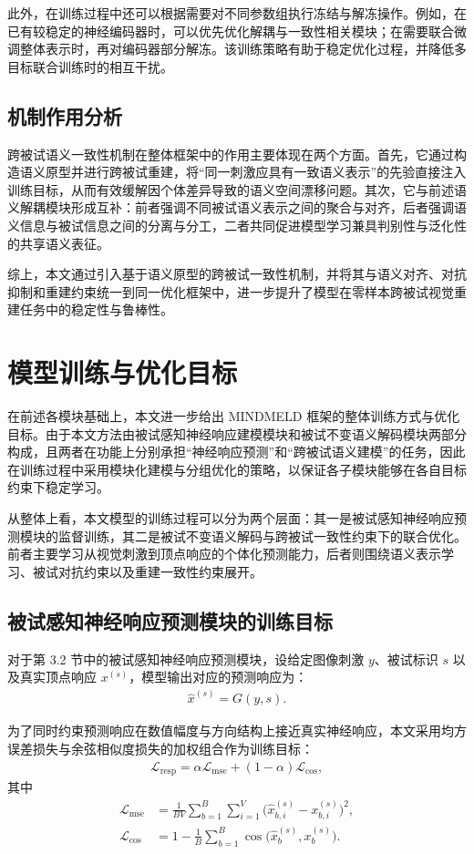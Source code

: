 此外，在训练过程中还可以根据需要对不同参数组执行冻结与解冻操作。例如，在已有较稳定的神经编码器时，可以优先优化解耦与一致性相关模块；在需要联合微调整体表示时，再对编码器部分解冻。该训练策略有助于稳定优化过程，并降低多目标联合训练时的相互干扰。

\subsection{机制作用分析}

跨被试语义一致性机制在整体框架中的作用主要体现在两个方面。首先，它通过构造语义原型并进行跨被试重建，将“同一刺激应具有一致语义表示”的先验直接注入训练目标，从而有效缓解因个体差异导致的语义空间漂移问题。其次，它与前述语义解耦模块形成互补：前者强调不同被试语义表示之间的聚合与对齐，后者强调语义信息与被试信息之间的分离与分工，二者共同促进模型学习兼具判别性与泛化性的共享语义表征。

综上，本文通过引入基于语义原型的跨被试一致性机制，并将其与语义对齐、对抗抑制和重建约束统一到同一优化框架中，进一步提升了模型在零样本跨被试视觉重建任务中的稳定性与鲁棒性。


\section{模型训练与优化目标}

在前述各模块基础上，本文进一步给出 MINDMELD 框架的整体训练方式与优化目标。由于本文方法由被试感知神经响应建模模块和被试不变语义解码模块两部分构成，且两者在功能上分别承担“神经响应预测”和“跨被试语义建模”的任务，因此在训练过程中采用模块化建模与分组优化的策略，以保证各子模块能够在各自目标约束下稳定学习。

从整体上看，本文模型的训练过程可以分为两个层面：其一是被试感知神经响应预测模块的监督训练，其二是被试不变语义解码与跨被试一致性约束下的联合优化。前者主要学习从视觉刺激到顶点响应的个体化预测能力，后者则围绕语义表示学习、被试对抗约束以及重建一致性约束展开。

\subsection{被试感知神经响应预测模块的训练目标}

对于第 3.2 节中的被试感知神经响应预测模块，设给定图像刺激 $y$、被试标识 $s$ 以及真实顶点响应 $x^{(s)}$，模型输出对应的预测响应为：
\begin{align}
  \hat{x}^{(s)} = G(y,s).
\end{align}

为了同时约束预测响应在数值幅度与方向结构上接近真实神经响应，本文采用均方误差损失与余弦相似度损失的加权组合作为训练目标：
\begin{align}
  \mathcal{L}_{\mathrm{resp}} = \alpha \mathcal{L}_{\mathrm{mse}} + (1-\alpha) \mathcal{L}_{\mathrm{cos}},
\end{align}
其中
\begin{align}
  \mathcal{L}_{\mathrm{mse}} &= \frac{1}{BV} \sum_{b=1}^{B} \sum_{i=1}^{V} \bigl(\hat{x}_{b,i}^{(s)} - x_{b,i}^{(s)}\bigr)^2, \\
  \mathcal{L}_{\mathrm{cos}} &= 1 - \frac{1}{B} \sum_{b=1}^{B} \cos\bigl(\hat{x}_{b}^{(s)}, x_{b}^{(s)}\bigr).
\end{align}

